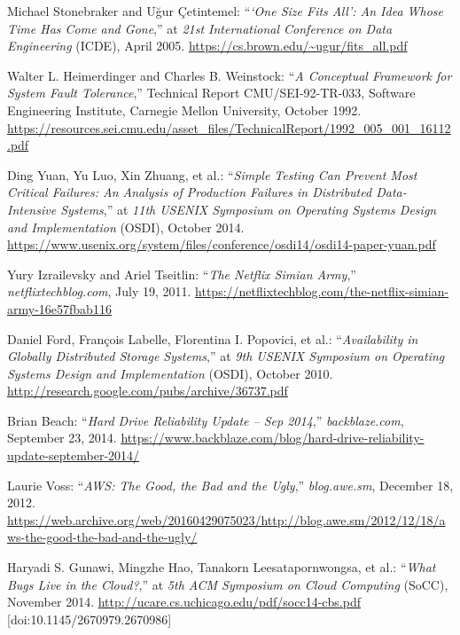 \begin{thebibliography}{99}

   Michael Stonebraker and Uğur Çetintemel: ``\textit{`One Size Fits All': An Idea Whose Time Has Come and Gone},'' at \textit{21st International Conference on Data Engineering} (ICDE), April 2005. \url{https://cs.brown.edu/~ugur/fits_all.pdf}

   Walter L. Heimerdinger and Charles B. Weinstock: ``\textit{A Conceptual Framework for System Fault Tolerance},'' Technical Report CMU/SEI-92-TR-033, Software Engineering Institute, Carnegie Mellon University, October 1992. \url{https://resources.sei.cmu.edu/asset_files/TechnicalReport/1992_005_001_16112.pdf}

   Ding Yuan, Yu Luo, Xin Zhuang, et al.: ``\textit{Simple Testing Can Prevent Most Critical Failures: An Analysis of Production Failures in Distributed Data-Intensive Systems},'' at \textit{11th USENIX Symposium on Operating Systems Design and Implementation} (OSDI), October 2014. \url{https://www.usenix.org/system/files/conference/osdi14/osdi14-paper-yuan.pdf}

   Yury Izrailevsky and Ariel Tseitlin: ``\textit{The Netflix Simian Army},'' \textit{netflixtechblog.com}, July 19, 2011. \url{https://netflixtechblog.com/the-netflix-simian-army-16e57fbab116}

   Daniel Ford, François Labelle, Florentina I. Popovici, et al.: ``\textit{Availability in Globally Distributed Storage Systems},'' at \textit{9th USENIX Symposium on Operating Systems Design and Implementation} (OSDI), October 2010. \url{http://research.google.com/pubs/archive/36737.pdf}

   Brian Beach: ``\textit{Hard Drive Reliability Update – Sep 2014},'' \textit{backblaze.com}, September 23, 2014. \url{https://www.backblaze.com/blog/hard-drive-reliability-update-september-2014/}

   Laurie Voss: ``\textit{AWS: The Good, the Bad and the Ugly},'' \textit{blog.awe.sm}, December 18, 2012. \url{https://web.archive.org/web/20160429075023/http://blog.awe.sm/2012/12/18/aws-the-good-the-bad-and-the-ugly/}

   Haryadi S. Gunawi, Mingzhe Hao, Tanakorn Leesatapornwongsa, et al.: ``\textit{What Bugs Live in the Cloud?},'' at \textit{5th ACM Symposium on Cloud Computing} (SoCC), November 2014. \url{http://ucare.cs.uchicago.edu/pdf/socc14-cbs.pdf} [doi:10.1145/2670979.2670986]


\end{thebibliography}
